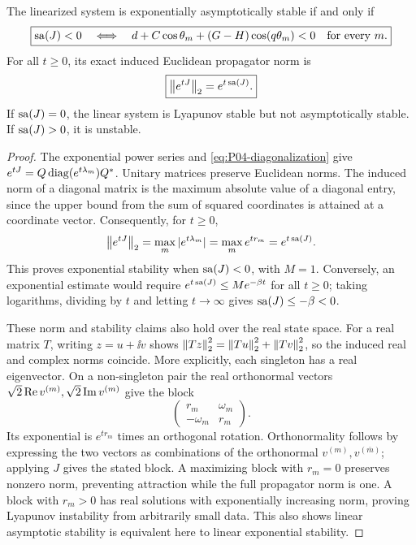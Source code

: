 \begin{corollary}
\label{cor:P04-stability}
The linearized system is exponentially asymptotically stable if and
only if
\begin{equation}
 \boxed{\operatorname{sa}(J)<0\quad\Longleftrightarrow\quad
   d+C\cos\theta_m+(G-H)\cos(q\theta_m)<0
      \quad\text{for every }m.}
 \label{eq:P04-stability}
\end{equation}
For all $t\ge0$, its exact induced Euclidean propagator norm is
\begin{equation}
 \boxed{\left\lVert e^{tJ}\right\rVert_2=e^{t\operatorname{sa}(J)}.}
 \label{eq:P04-semigroup}
\end{equation}
If $\operatorname{sa}(J)=0$, the linear system is Lyapunov stable but not
asymptotically stable. If $\operatorname{sa}(J)>0$, it is unstable.
\end{corollary}
\begin{proof}
The exponential power series and \eqref{eq:P04-diagonalization} give
$e^{tJ}=Q\operatorname{diag}(e^{t\lambda_m})Q^*$. Unitary matrices preserve
Euclidean norms. The induced norm of a diagonal matrix is the
maximum absolute value of a diagonal entry, since the upper bound
from the sum of squared coordinates is attained at a coordinate
vector. Consequently, for $t\ge0$,
\[
 \left\lVert e^{tJ}\right\rVert_2=\max_m|e^{t\lambda_m}|
               =\max_m e^{tr_m}=e^{t\operatorname{sa}(J)}.
\]
This proves exponential stability when $\operatorname{sa}(J)<0$, with $M=1$.
Conversely, an exponential estimate would require
$e^{t\operatorname{sa}(J)}\le Me^{-\beta t}$ for all $t\ge0$; taking
logarithms, dividing by $t$ and letting $t\to\infty$ gives
$\operatorname{sa}(J)\le-\beta<0$.

These norm and stability claims also hold over the real state space.
For a real matrix $T$, writing $z=u+\ii v$ shows
$\left\lVert Tz\right\rVert_2^2=\left\lVert Tu\right\rVert_2^2+\left\lVert Tv\right\rVert_2^2$, so the induced
real and complex norms coincide. More explicitly, each singleton
has a real eigenvector. On a non-singleton pair the real orthonormal
vectors $\sqrt2\operatorname{Re} v^{(m)},\sqrt2\operatorname{Im} v^{(m)}$ give the block
\[
 \begin{pmatrix}r_m&\omega_m\\-\omega_m&r_m\end{pmatrix}.
\]
Its exponential is $e^{tr_m}$ times an orthogonal rotation.
Orthonormality follows by expressing the two vectors as combinations
of the orthonormal $v^{(m)},v^{(\bar m)}$; applying $J$ gives the
stated block. A maximizing block with $r_m=0$ preserves nonzero
norm, preventing attraction while the full propagator norm is one.
A block with $r_m>0$ has real solutions with exponentially increasing
norm, proving Lyapunov instability from arbitrarily small data.
This also shows linear asymptotic stability is equivalent here to
linear exponential stability.
\end{proof}


